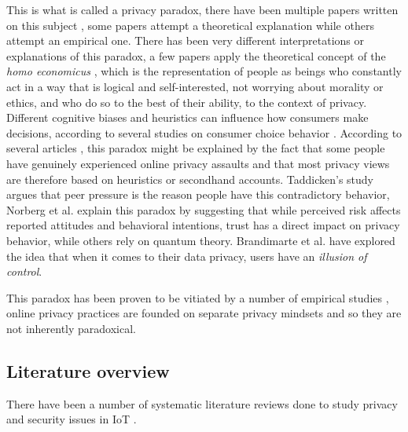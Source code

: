 \documentclass[conference]{IEEEtran}
\begin{document}
This is what is called a privacy paradox, there have been multiple papers
written on this subject \cite{solove2021myth, WilliamsPrivacy, lee2021investigating, goad2021privacy, gerber2018explaining},
some papers attempt a theoretical explanation while others attempt an empirical one.
There has been very different interpretations or explanations of this paradox,
a few papers \cite{wilson2012unpacking, warshaw2015can, lee2015privacy} apply the theoretical concept of the \textit{homo economicus} \cite{zak2008moral},
which is the representation of people as beings who constantly act in a way
that is logical and self-interested, not worrying about morality or ethics, and
who do so to the best of their ability, to the context of privacy.
Different cognitive biases and heuristics can influence how consumers make decisions,
according to several studies on consumer choice behavior \cite{acquisti2007can, knijnenburg2013dimensionality, wakefield2013influence, flender2012type}.
According to several articles \cite{dienlin2015privacy, baek2014solving}, this paradox might be explained by the
fact that some people have genuinely experienced online privacy assaults
and that most privacy views are therefore based on heuristics or secondhand accounts.
Taddicken's study \cite{taddicken2014privacy} argues that peer pressure is the reason people have this contradictory behavior,
Norberg et al. \cite{norberg2007privacy} explain this paradox by suggesting that while perceived
risk affects reported attitudes and behavioral intentions, trust has a direct
impact on privacy behavior, while others \cite{flender2012type, kokolakis2017privacy} rely on quantum theory.
Brandimarte et al. \cite{brandimarte2013misplaced} have explored the idea that when it comes to their
data privacy, users have an \textit{illusion of control}.

This paradox has been proven to be vitiated by a number of empirical studies \cite{dienlin2015privacy, xie2019consumers, SCHWAIG20131, sannon2018privacy},
online privacy practices are founded on separate privacy mindsets and so they are not inherently paradoxical.

\subsection{Literature overview}

There have been a number of systematic literature reviews done to study privacy and security issues in
IoT \cite{shi2020applications, atlam2020iot, LoukilPrivacy, SICARI2015146, vcolakovic2018internet, chitanya2018robustness, chanal2020security, LinSurvey, 7446846}.
\end{document}

